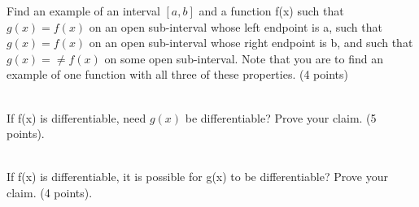 Find an example of an interval $[a,b]$ and a function f(x) such that $g(x)=f(x)$ on an open sub-interval whose left endpoint is a, such that $g(x)=f(x)$ on an open sub-interval whose right endpoint is b, and such that $g(x) =\neq f(x)$ on some open sub-interval. Note that you are to find an example of one function with all three of these properties. (4 points) \\ 
\begin{figure}[h]\end{figure} 
\\

\newpage
If f(x) is differentiable, need $g(x)$ be differentiable? Prove your claim. (5 points). \\ 

\begin{figure}[h]\end{figure} 
\\
\newpage
If f(x) is differentiable, it is possible for g(x) to be differentiable? Prove your claim. (4 points).


